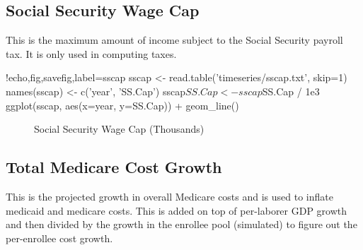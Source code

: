 \documentclass{article}
\begin{document}
\subsection{Social Security Wage Cap}
This is the maximum amount of income subject to the Social Security
payroll tax. It is only used in computing taxes.

\begin{Rcode}{!echo,fig,savefig,label=sscap}
sscap <- read.table('timeseries/sscap.txt', skip=1)
names(sscap) <- c('year', 'SS.Cap')
sscap$SS.Cap <- sscap$SS.Cap / 1e3
ggplot(sscap, aes(x=year, y=SS.Cap)) + geom_line()
\end{Rcode}

\begin{figure}[h]
\centering
{}
\caption{Social Security Wage Cap (Thousands)}
\label{fig:sscap}
\end{figure}

\subsection{Total Medicare Cost Growth}
This is the projected growth in overall Medicare costs and is used to
inflate medicaid and medicare costs. This is added on top of
per-laborer GDP growth and then divided by the growth in the enrollee
pool (simulated) to figure out the per-enrollee cost growth.
\end{document}

